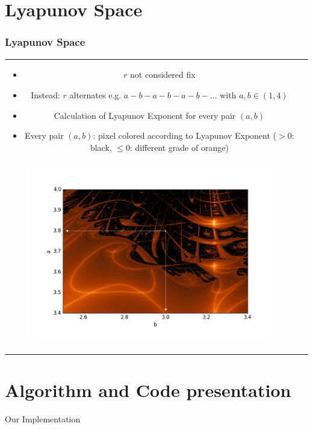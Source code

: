 \documentclass[ignorenonframetext]{beamer}
\begin{document}
\section*{Lyapunov Space}
\begin{frame}
\frametitle{Lyapunov Space}
\begin{tabular}{cr}
\begin{minipage}[t]{0.5\textwidth}
\vspace*{5pt}
\begin{itemize}	
\item $r$ not considered fix
\item Instead: $r$ alternates e.g. $a-b-a-b-a-b-...$ with $a,b\in (1,4)$
\item Calculation of Lyapunov Exponent for every pair $(a,b)$ 
\item Every pair $(a,b)$: pixel colored according to Lyapunov Exponent ($>0$: black, $\leq0$: different grade of orange)
\end{itemize}
\end{minipage}

\begin{minipage}[t]{0.4\textwidth}
\begin{figure}[htbp]
\includegraphics[width = \textwidth]{erklaerung.png}
\end{figure}
\end{minipage}
\end{tabular}
\end{frame}

\section*{Algorithm and Code presentation}
\begin{frame}
\begin{center}
\begin{Huge}
Our Implementation
\end{Huge}
\end{center}
\end{frame}
\end{document}
